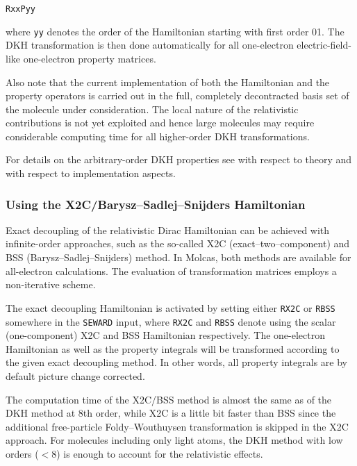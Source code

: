 \hspace*{1cm} {\tt RxxPyy}

where {\tt yy} denotes the order of the Hamiltonian starting with first order 01.
The DKH transformation is then done automatically for all one-electron electric-field-like
one-electron property matrices.

Also note that the current implementation of both the Hamiltonian and the property
operators is carried out in the full, completely decontracted basis set of the
molecule under consideration. The local nature of the relativistic contributions is not
yet exploited and hence large molecules may require considerable computing time for
all higher-order DKH transformations.

For details on the arbitrary-order DKH properties see \cite{DKH_Theory2} with respect to theory
and \cite{DKH_Implementation2,R2C_review} with respect to implementation aspects.

\subsubsection{Using the X2C/Barysz--Sadlej--Snijders Hamiltonian}

Exact decoupling of the relativistic Dirac Hamiltonian can be achieved with infinite-order
approaches, such as the so-called X2C (exact--two--component) and BSS (Barysz--Sadlej--Snijders)
method. In Molcas, both methods are available for all-electron calculations. The
evaluation of transformation matrices employs a non-iterative scheme.

The exact decoupling Hamiltonian is activated by setting either {\tt RX2C} or {\tt RBSS}
somewhere in the {\tt SEWARD} input, where {\tt RX2C} and {\tt RBSS} denote using the
scalar (one-component) X2C and BSS Hamiltonian respectively. The one-electron Hamiltonian
as well as the property integrals will be transformed according to the given exact decoupling method.
In other words, all property integrals are by default picture change corrected.

The computation time of the X2C/BSS method is almost the same as of the DKH method at 8th order,
while X2C is a little bit faster than BSS since the additional free-particle Foldy--Wouthuysen
transformation is skipped in the X2C approach\cite{R2C_review}. For molecules including only light atoms,
the DKH method with low orders ($<$8) is enough to account for the relativistic effects.

